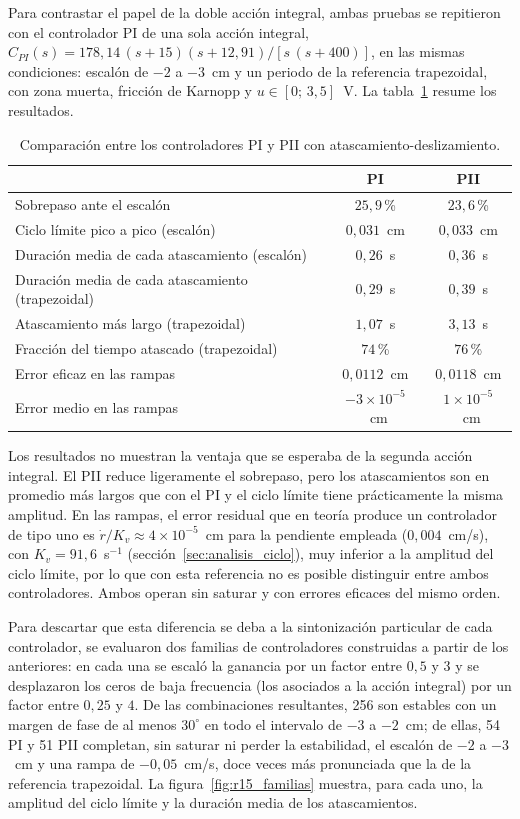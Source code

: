 Para contrastar el papel de la doble acción integral, ambas pruebas se repitieron con el controlador PI de una sola acción integral, $C_{PI}(s)=178{,}14\,(s+15)(s+12{,}91)/[s\,(s+400)]$, en las mismas condiciones: escalón de $-2$ a $-3$~cm y un periodo de la referencia trapezoidal, con zona muerta, fricción de Karnopp y $u\in[0;\,3{,}5]$~V. La tabla~\ref{tab:pi_pii} resume los resultados.

\begin{table}[ht]
\centering
\caption{Comparación entre los controladores PI y PII con atascamiento-deslizamiento.}
\label{tab:pi_pii}
\begin{tabular}{|l|c|c|}
\hline
 & PI & PII \\ \hline
Sobrepaso ante el escalón & $25{,}9$\,\% & $23{,}6$\,\% \\ \hline
Ciclo límite pico a pico (escalón) & $0{,}031$~cm & $0{,}033$~cm \\ \hline
Duración media de cada atascamiento (escalón) & $0{,}26$~s & $0{,}36$~s \\ \hline
Duración media de cada atascamiento (trapezoidal) & $0{,}29$~s & $0{,}39$~s \\ \hline
Atascamiento más largo (trapezoidal) & $1{,}07$~s & $3{,}13$~s \\ \hline
Fracción del tiempo atascado (trapezoidal) & $74$\,\% & $76$\,\% \\ \hline
Error eficaz en las rampas & $0{,}0112$~cm & $0{,}0118$~cm \\ \hline
Error medio en las rampas & $-3\times10^{-5}$~cm & $1\times10^{-5}$~cm \\ \hline
\end{tabular}
\end{table}

Los resultados no muestran la ventaja que se esperaba de la segunda acción integral. El PII reduce ligeramente el sobrepaso, pero los atascamientos son en promedio más largos que con el PI y el ciclo límite tiene prácticamente la misma amplitud. En las rampas, el error residual que en teoría produce un controlador de tipo uno es $\dot r/K_v \approx 4\times10^{-5}$~cm para la pendiente empleada ($0{,}004$~cm/s), con $K_v=91{,}6$~s$^{-1}$ (sección~\ref{sec:analisis_ciclo}), muy inferior a la amplitud del ciclo límite, por lo que con esta referencia no es posible distinguir entre ambos controladores. Ambos operan sin saturar y con errores eficaces del mismo orden.

Para descartar que esta diferencia se deba a la sintonización particular de cada controlador, se evaluaron dos familias de controladores construidas a partir de los anteriores: en cada una se escaló la ganancia por un factor entre $0{,}5$ y $3$ y se desplazaron los ceros de baja frecuencia (los asociados a la acción integral) por un factor entre $0{,}25$ y $4$. De las combinaciones resultantes, 256 son estables con un margen de fase de al menos $30^\circ$ en todo el intervalo de $-3$ a $-2$~cm; de ellas, 54 PI y 51 PII completan, sin saturar ni perder la estabilidad, el escalón de $-2$ a $-3$~cm y una rampa de $-0{,}05$~cm/s, doce veces más pronunciada que la de la referencia trapezoidal. La figura~\ref{fig:r15_familias} muestra, para cada uno, la amplitud del ciclo límite y la duración media de los atascamientos.

